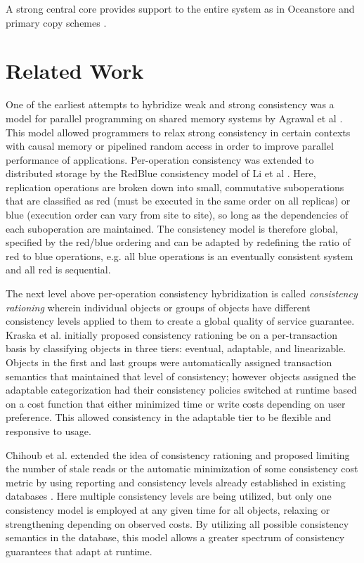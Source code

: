 \documentclass[10pt,conference,compsocconf,letterpaper]{IEEEtran}
\begin{document}
A strong central core provides support to the entire system as in Oceanstore \cite{kubiatowicz_oceanstore:_2000} and primary copy schemes \cite{gray_dangers_1996}.

\section{Related Work}

One of the earliest attempts to hybridize weak and strong consistency was a model for parallel programming on shared memory systems by Agrawal et al \cite{agrawal_mixed_1994}. This model allowed programmers to relax strong consistency in certain contexts with causal memory or pipelined random access in order to improve parallel performance of applications. Per-operation consistency was extended to distributed storage by the RedBlue consistency model of Li et al \cite{li_making_2012}. Here, replication operations are broken down into small, commutative suboperations that are classified as red (must be executed in the same order on all replicas) or blue (execution order can vary from site to site), so long as the dependencies of each suboperation are maintained. The consistency model is therefore global, specified by the red/blue ordering and can be adapted by redefining the ratio of red to blue operations, e.g. all blue operations is an eventually consistent system and all red is sequential.

The next level above per-operation consistency hybridization is called \textit{consistency rationing} wherein individual objects or groups of objects have different consistency levels applied to them to create a global quality of service guarantee. Kraska et al. \cite{kraska_consistency_2009} initially proposed consistency rationing be on a per-transaction basis by classifying objects in three tiers: eventual, adaptable, and linearizable. Objects in the first and last groups were automatically assigned transaction semantics that maintained that level of consistency; however objects assigned the adaptable categorization had their consistency policies switched at runtime based on a cost function that either minimized time or write costs depending on user preference. This allowed consistency in the adaptable tier to be flexible and responsive to usage.

Chihoub et al. extended the idea of consistency rationing and proposed limiting the number of stale reads or the automatic minimization of some consistency cost metric by using reporting and consistency levels already established in existing databases \cite{chihoub_harmony:_2012,chihoub_consistency_2013}. Here multiple consistency levels are being utilized, but only one consistency model is employed at any given time for all objects, relaxing or strengthening depending on observed costs. By utilizing all possible consistency semantics in the database, this model allows a greater spectrum of consistency guarantees that adapt at runtime.
\end{document}
